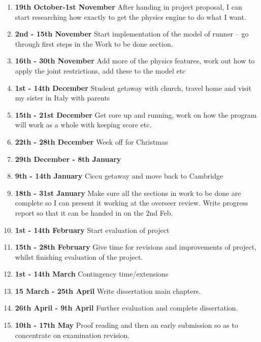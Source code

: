 \documentclass[12pt,a4paper,twoside]{article}
\begin{document}
\begin{enumerate}
\item \textbf{19th October-1st November} After handing in project proposal, I can start researching how exactly to get the physics engine to do what I want.

\item \textbf{2nd - 15th November} Start implementation of the model of runner -- go through first steps in the Work to be done section.

\item \textbf{16th - 30th November}
Add more of the physics features, work out how to apply the joint restrictions, add these to the model etc

\item \textbf{1st - 14th December}
Student getaway with church, travel home and visit my sister in Italy with parents
\item \textbf{15th - 21st December}
Get core up and running, work on how the program will work as a whole with keeping score etc.
\item \textbf{22th - 28th December}
Week off for Christmas
\item \textbf{29th December - 8th January}

\item \textbf{9th - 14th January}
Ciccu getaway and move back to Cambridge

\item \textbf{18th - 31st January}
Make sure all the sections in work to be done are complete so I can present it working at the overseer review.
Write progress report so that it can be handed in on the 2nd Feb. 

\item \textbf{1st - 14th February}
Start evaluation of project

\item \textbf{15th - 28th February}
Give time for revisions and improvements of project, whilst finishing evaluation of the project.

\item \textbf{1st - 14th March}
Contingency time/extensions

\item \textbf{15 March - 25th April}
Write dissertation main chapters.

\item \textbf{26th April - 9th April}
Further evaluation and complete dissertation.

\item \textbf{10th - 17th May}
Proof reading and then an early submission so as to concentrate on examination revision.

\end{enumerate}


 
\end{document}
